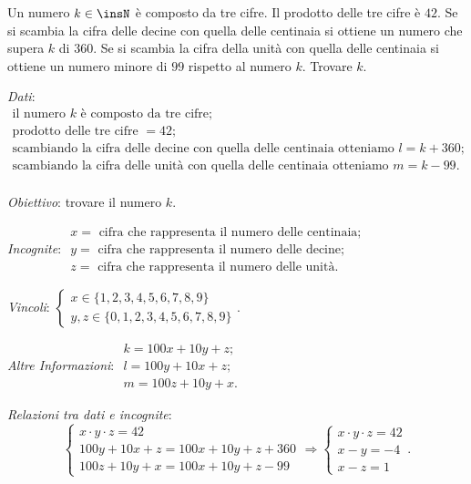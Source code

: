 \begin{problema}
Un numero $k\in \insN$ è composto da tre cifre. Il prodotto delle tre cifre è $42$. Se si scambia la cifra delle decine con quella delle centinaia si ottiene un numero che supera $k$ di $360$. Se si scambia la cifra della unità con quella delle centinaia si ottiene un numero minore di $99$ rispetto al numero $k$. Trovare $k$.
\end{problema}

\emph{Dati}: $\begin{array}{l}
\text{il numero } k \text{ è composto da tre cifre};\\
\text{prodotto delle tre cifre } = 42;\\
\text{scambiando la cifra delle decine con quella delle centinaia otteniamo }l=k+360; \\
\text{scambiando la cifra delle unità con quella delle centinaia otteniamo } m=k-99.\\
\end{array}$

\emph{Obiettivo}: trovare il numero $k$.

\emph{Incognite}: $\begin{array}{l}
x =\text{ cifra che rappresenta il numero delle centinaia;}\\
y=\text{ cifra che rappresenta il numero delle decine;}\\
z=\text{ cifra che rappresenta il numero delle unità.}
\end{array}$

\emph{Vincoli}: $\left\{\begin{array}{l}x\in \{1,2,3,4,5,6,7,8,9\} \\y,z\in \{0,1,2,3,4,5,6,7,8,9\}\end{array}\right.$.

\emph{Altre Informazioni}: $\begin{array}{l}
k=100x+10y+z;\\
l=100y+10x+z;\\
m=100z+10y+x.
\end{array}$

\emph{Relazioni tra dati e incognite}: \[ \left\{\begin{array}{l}x\cdot y\cdot z=42 \\100y+10x+z=100x+10y+z+360\\100z+10y+x=100x+10y+z-99 \end{array}\right.\Rightarrow \left\{\begin{array}{l}x\cdot y\cdot z=42 \\x-y=-4\\x-z=1\end{array}\right.. \]

